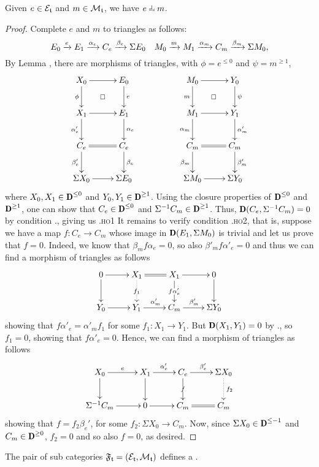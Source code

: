 \begin{lemma}
Given $e\in \mathcal{E}_{\mathfrak{t}}$ and $m\in\mathcal{M}_{\mathfrak{t}}$, we have $e \horth  m$. 
\end{lemma}
\begin{proof}
Complete $e$ and $m$ to triangles as follows:
\[
E_0 \xrightarrow{e}  E_1 \xrightarrow{\alpha_e} C_e \xrightarrow{\beta_e} \Sigma E_0\ \ \ M_0 \xrightarrow{m}  M_1 \xrightarrow{\alpha_m} C_m \xrightarrow{\beta_m} \Sigma M_0,
\] 
By Lemma , there are morphisms of triangles, with $\phi=e^{\leq0}$ and $\psi=m^{\geq1}$,
\[
\xymatrix{
X_0\ar@{}[dr]|{\square}\ar[d]_\phi\ar[r]&E_0\ar[d]^e&&M_0\ar@{}[dr]|{\square}\ar[d]_m\ar[r]&Y_0\ar[d]^\psi\\
X_1\ar[d]_{\alpha_e'}\ar[r]&E_1\ar[d]^{\alpha_e}&&M_1\ar[d]_{\alpha_m}\ar[r]&Y_1\ar[d]^{\alpha_m'}\\
C_e\ar[d]_{\beta_e'}\ar@{=}[r]&C_e\ar[d]^{\beta_e}&&C_m\ar[d]_{\beta_m}\ar@{=}[r]&C_m\ar[d]^{\beta_m'}\\
\Sigma X_0\ar[r]&\Sigma E_0&&\Sigma M_0\ar[r]&\Sigma Y_0}
\]
where $X_0, X_1\in  \cD^{\leq 0} $ and $Y_0, Y_1\in  \cD^{\geq 1} $. Using the closure properties of $ \cD^{\leq 0} $ and $ \cD^{\geq 1} $, one can show that $C_e\in  \cD^{\leq 0} $ and $\Sigma^{-1}C_m\in  \cD^{\geq  1} $. Thus, $\cD(C_e,\Sigma^{-1}C_m)=0$ by condition ., giving us  .\textsc{ho}1 It remains to verify condition .\textsc{ho}2, that is, suppose  we have a map $f\colon C_e\to C_m$ whose image in $\cD(E_1,\Sigma M_0)$ is trivial and let us prove that $f=0$. Indeed, we know that $\beta_mf\alpha_e=0$, so also $\beta'_mf\alpha'_e=0$ and thus we can find a morphism of triangles as follows
\[
\xymatrix{
0\ar[r]\ar[d]&X_1\ar@{=}[r]\ar@{.>}[d]|{f_1}&X_1\ar[r]\ar[d]|{f\alpha'_e}&0\ar[d]\\
Y_0\ar[r]&Y_1\ar[r]^{\alpha'_m}&C_m\ar[r]^{\beta'_m}&\Sigma Y_0
}
\]
showing that $f\alpha'_e=\alpha'_m f_1$ for some $f_1\colon X_1\to Y_1$. But $\cD(X_1,Y_1)=0$ by ., so $f_1=0$, showing that $f\alpha'_e=0$. Hence, we can find a morphism of triangles as follows
\[
\xymatrix{
X_0\ar[r]^{e}\ar[d]&X_1\ar[r]^{\alpha'_e}\ar[d]&C_e\ar[r]^{\beta_e'}\ar[d]|{f}&\Sigma X_0\ar@{.>}[d]^{f_2}\\
\Sigma^{-1}C_m\ar[r]&0\ar[r]&C_m\ar@{=}[r]&C_m
}
\]
showing that $f=f_2\beta_e'$, for some $f_2\colon \Sigma X_0\to C_m$. Now, since $\Sigma X_0\in  \cD^{\leq -1} $ and $C_m\in  \cD^{\geq 0} $, $f_2=0$ and so also $f=0$, as desired.
\end{proof}
\begin{proposition}
The pair of sub categories $\mathfrak{F}_{\mathfrak{t}}=(\mathcal{E}_{\mathfrak{t}},\mathcal{M}_{\mathfrak{t}})$ defines a \hfs.
\end{proposition}
